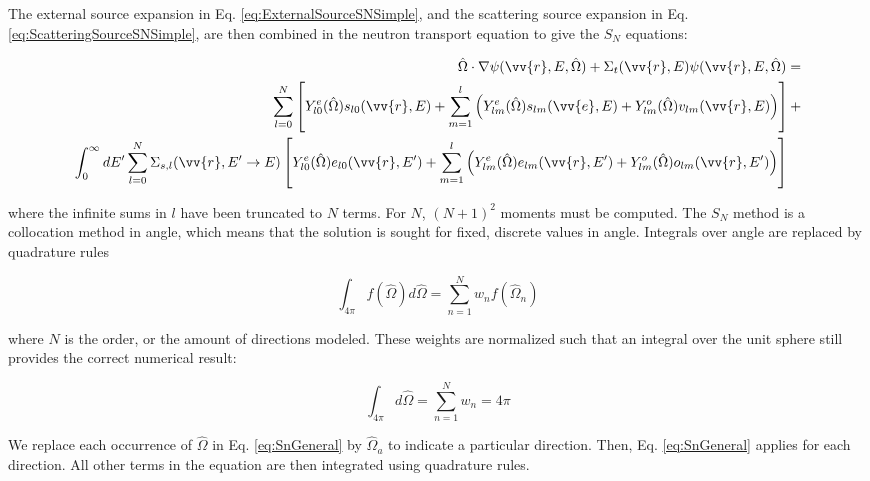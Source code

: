 \documentclass[10pt]{article}
\begin{document}
\begin{flushleft}
The external source expansion in Eq. \eqref{eq:ExternalSourceSNSimple}, and the scattering source expansion in Eq. \eqref{eq:ScatteringSourceSNSimple}, are then combined in the neutron transport equation to give the \(S_N\) equations:

\begin{equation}
\label{eq:SnGeneral}
\begin{aligned}
 \hat{\Omega}\cdot\nabla\psi(\vv{r}, E, \hat{\Omega}) + 
 \Sigma_t(\vv{r},E)\psi(\vv{r}, E, \hat{\Omega}) = \\
\sum_{l=0}^{N}\left\lbrack Y_{l0}^e(\hat{\Omega})s_{l0}(\vv{r},E)+\sum_{m=1}^{l}\left(Y_{lm}^e(\hat{\Omega})s_{lm}(\vv{e},E)+Y_{lm}^o(\hat{\Omega})v_{lm}(\vv{r},E)\right)\right\rbrack+\\
\int_{0}^{\infty}dE' \sum_{l=0}^{N}\Sigma_{s,l}(\vv{r}, E'\rightarrow E)\left\lbrack Y_{l0}^e(\hat{\Omega})e_{l0}(\vv{r},E')+\sum_{m=1}^{l}\left(Y_{lm}^e(\hat{\Omega})e_{lm}(\vv{r},E')+Y_{lm}^o(\hat{\Omega})o_{lm}(\vv{r},E')\right)\right\rbrack\quad\\
\end{aligned}
\end{equation}

where the infinite sums in \(l\) have been truncated to \(N\) terms. For \(N\), \((N+1)^2\) moments must be computed. The \(S_N\) method is a collocation method in angle, which means that the solution is sought for fixed, discrete values in angle. Integrals over angle are replaced by quadrature rules

\begin{equation}
\label{eq:multigroupTE2}
\int_{4\pi}^{} f(\hat{\Omega})d\hat{\Omega} = \sum_{n=1}^{N} w_n f(\hat{\Omega}_n)
\end{equation}

where \(N\) is the order, or the amount of directions modeled. These weights are normalized such that an integral over the unit sphere still provides the correct numerical result:

\begin{equation}
\label{eq:QuadratureNormalization}
\int_{4\pi}^{}d\hat{\Omega}=\sum_{n=1}^{N} w_n =4\pi
\end{equation}

We replace each occurrence of \(\hat{\Omega}\) in Eq. \eqref{eq:SnGeneral} by \(\hat{\Omega}_a\) to indicate a particular direction. Then, Eq. \eqref{eq:SnGeneral} applies for each direction. All other terms in the equation are then integrated using quadrature rules. 


\end{flushleft}
\end{document}
